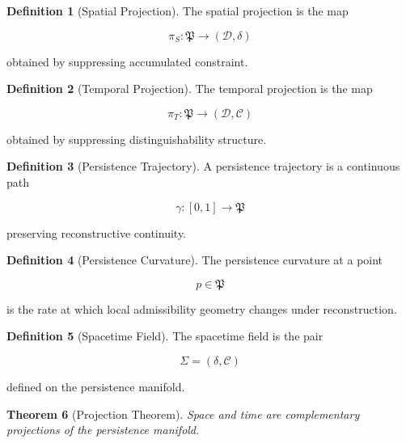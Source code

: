 \documentclass[12pt,oneside]{article}
\newtheorem{theorem}{Theorem}[section] \newtheorem{lemma}[theorem]{Lemma} \newtheorem{proposition}[theorem]{Proposition} \newtheorem{corollary}[theorem]{Corollary}
\theoremstyle{definition}
\newtheorem{definition}[theorem]{Definition} \newtheorem{axiom}[theorem]{Axiom} \newtheorem{remark}[theorem]{Remark} \newtheorem{example}[theorem]{Example}
\begin{document}
\begin{definition}[Spatial Projection]

The spatial projection is the map

\[
\pi_S :
\mathfrak P
\rightarrow
(\mathcal D,\delta)
\]

obtained by suppressing accumulated constraint.

\end{definition}

\begin{definition}[Temporal Projection]

The temporal projection is the map

\[
\pi_T :
\mathfrak P
\rightarrow
(\mathcal D,\mathcal C)
\]

obtained by suppressing distinguishability structure.

\end{definition}

\begin{definition}[Persistence Trajectory]

A persistence trajectory is a continuous path

\[
\gamma :
[0,1]
\rightarrow
\mathfrak P
\]

preserving reconstructive continuity.

\end{definition}

\begin{definition}[Persistence Curvature]

The persistence curvature at a point

\[
p\in\mathfrak P
\]

is the rate at which local admissibility geometry changes under reconstruction.

\end{definition}

\begin{definition}[Spacetime Field]

The spacetime field is the pair

\[
\Sigma
=
(\delta,\mathcal C)
\]

defined on the persistence manifold.

\end{definition}

\begin{theorem}[Projection Theorem]

Space and time are complementary projections of the persistence manifold.

\end{theorem}
\end{document}
